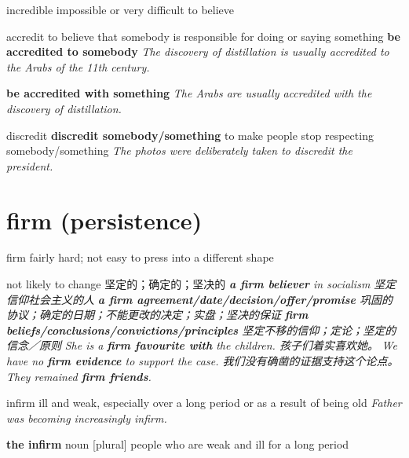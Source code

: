 \begin{DefWord}{incredible}
    impossible or very difficult to believe
\end{DefWord}

\begin{DefWord}{accredit}
    to believe that somebody is responsible for doing or saying something
    \textbf{be accredited to somebody} \textit{The discovery of distillation is usually accredited to the Arabs of the 11th century.}

    \textbf{be accredited with something} \textit{The Arabs are usually accredited with the discovery of distillation.}
\end{DefWord}

\begin{DefWord}{discredit}
    \textbf{discredit somebody/something} to make people stop respecting somebody/something
    \textit{The photos were deliberately taken to discredit the president.}
\end{DefWord}








\section{firm (persistence)}

\begin{DefWord}{firm}
    fairly hard; not easy to press into a different shape


    not likely to change 坚定的；确定的；坚决的
    \textit{\textbf{a firm believer} in socialism 坚定信仰社会主义的人}
    \textit{\textbf{a firm agreement/date/decision/offer/promise} 巩固的协议；确定的日期；不能更改的决定；实盘；坚决的保证}
    \textit{\textbf{firm beliefs/conclusions/convictions/principles} 坚定不移的信仰；定论；坚定的信念／原则}
    \textit{She is a \textbf{firm favourite with} the children. 孩子们着实喜欢她。}
    \textit{We have no \textbf{firm evidence} to support the case. 我们没有确凿的证据支持这个论点。}
    \textit{They remained \textbf{firm friends}.}
\end{DefWord}

\begin{DefWord}{infirm}
    ill and weak, especially over a long period or as a result of being old
    \textit{Father was becoming increasingly infirm.}

    \textbf{the infirm} noun [plural] people who are weak and ill for a long period
\end{DefWord}


